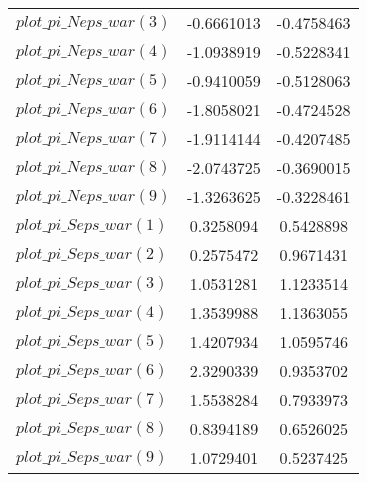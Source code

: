 \begin{center}
\begin{longtable}{lcc}
$plot\_pi\_N eps\_war (3)   $	 & 	     -0.6661013	 & 	     -0.4758463 \\ 
$plot\_pi\_N eps\_war (4)   $	 & 	     -1.0938919	 & 	     -0.5228341 \\ 
$plot\_pi\_N eps\_war (5)   $	 & 	     -0.9410059	 & 	     -0.5128063 \\ 
$plot\_pi\_N eps\_war (6)   $	 & 	     -1.8058021	 & 	     -0.4724528 \\ 
$plot\_pi\_N eps\_war (7)   $	 & 	     -1.9114144	 & 	     -0.4207485 \\ 
$plot\_pi\_N eps\_war (8)   $	 & 	     -2.0743725	 & 	     -0.3690015 \\ 
$plot\_pi\_N eps\_war (9)   $	 & 	     -1.3263625	 & 	     -0.3228461 \\ 
$plot\_pi\_S eps\_war (1)   $	 & 	      0.3258094	 & 	      0.5428898 \\ 
$plot\_pi\_S eps\_war (2)   $	 & 	      0.2575472	 & 	      0.9671431 \\ 
$plot\_pi\_S eps\_war (3)   $	 & 	      1.0531281	 & 	      1.1233514 \\ 
$plot\_pi\_S eps\_war (4)   $	 & 	      1.3539988	 & 	      1.1363055 \\ 
$plot\_pi\_S eps\_war (5)   $	 & 	      1.4207934	 & 	      1.0595746 \\ 
$plot\_pi\_S eps\_war (6)   $	 & 	      2.3290339	 & 	      0.9353702 \\ 
$plot\_pi\_S eps\_war (7)   $	 & 	      1.5538284	 & 	      0.7933973 \\ 
$plot\_pi\_S eps\_war (8)   $	 & 	      0.8394189	 & 	      0.6526025 \\ 
$plot\_pi\_S eps\_war (9)   $	 & 	      1.0729401	 & 	      0.5237425 \\ 
\end{longtable}
 \end{center}

